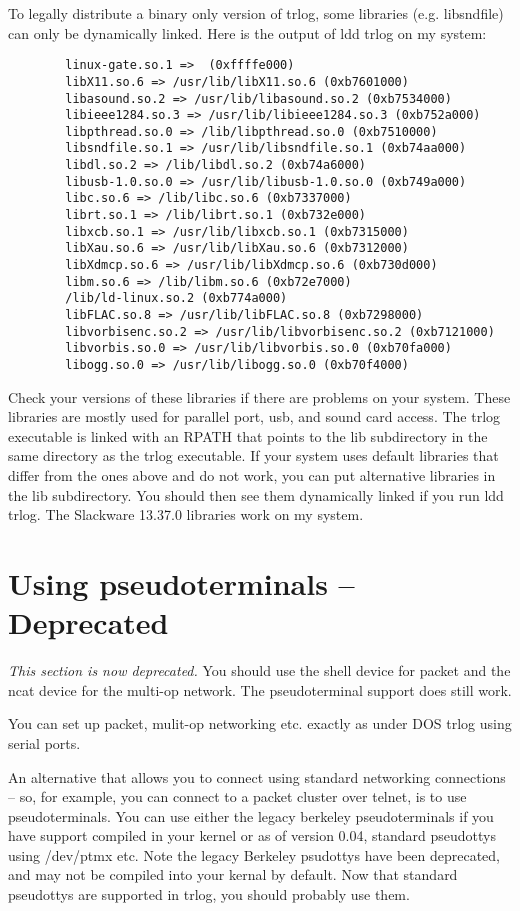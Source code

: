 \documentclass[12pt]{article}
\begin{document}
To legally distribute a binary only version of trlog, some libraries
(e.g. libsndfile) can only be dynamically linked. Here is the output
of ldd trlog on my system:
\begin{verbatim}
        linux-gate.so.1 =>  (0xffffe000)
        libX11.so.6 => /usr/lib/libX11.so.6 (0xb7601000)
        libasound.so.2 => /usr/lib/libasound.so.2 (0xb7534000)
        libieee1284.so.3 => /usr/lib/libieee1284.so.3 (0xb752a000)
        libpthread.so.0 => /lib/libpthread.so.0 (0xb7510000)
        libsndfile.so.1 => /usr/lib/libsndfile.so.1 (0xb74aa000)
        libdl.so.2 => /lib/libdl.so.2 (0xb74a6000)
        libusb-1.0.so.0 => /usr/lib/libusb-1.0.so.0 (0xb749a000)
        libc.so.6 => /lib/libc.so.6 (0xb7337000)
        librt.so.1 => /lib/librt.so.1 (0xb732e000)
        libxcb.so.1 => /usr/lib/libxcb.so.1 (0xb7315000)
        libXau.so.6 => /usr/lib/libXau.so.6 (0xb7312000)
        libXdmcp.so.6 => /usr/lib/libXdmcp.so.6 (0xb730d000)
        libm.so.6 => /lib/libm.so.6 (0xb72e7000)
        /lib/ld-linux.so.2 (0xb774a000)
        libFLAC.so.8 => /usr/lib/libFLAC.so.8 (0xb7298000)
        libvorbisenc.so.2 => /usr/lib/libvorbisenc.so.2 (0xb7121000)
        libvorbis.so.0 => /usr/lib/libvorbis.so.0 (0xb70fa000)
        libogg.so.0 => /usr/lib/libogg.so.0 (0xb70f4000)
\end{verbatim}
Check your versions of these libraries if there are problems on your
system. These libraries are mostly
used for parallel port, usb, and sound card access.
The trlog executable is linked with an RPATH that points
to the lib subdirectory in the same directory as the trlog executable.
If your system uses default libraries that differ from the ones
above and do not work, you can put alternative libraries in the lib
subdirectory. You should then see them dynamically linked
if you run ldd trlog. The Slackware 13.37.0 libraries work on my
system.

\section{Using pseudoterminals -- Deprecated}
{\em This section is now deprecated.} You should use the shell device
for packet and the ncat device for the multi-op network. The pseudoterminal
support does still work.

You can set up packet, mulit-op networking etc.
exactly as under DOS trlog using
serial ports.

An alternative that allows you to connect using standard networking
connections -- so, for example, you can connect to a packet cluster
over telnet, is to use pseudoterminals.
You can use either the legacy berkeley pseudoterminals if you have
support compiled in your kernel or as of
version 0.04, standard pseudottys using /dev/ptmx etc.
Note the legacy Berkeley psudottys have been deprecated, and may
not be compiled into your kernal by default.  Now that standard
pseudottys are supported in trlog, you should probably use them.
\end{document}
